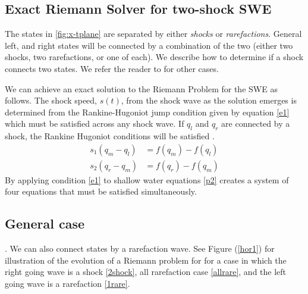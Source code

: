 \documentclass[11pt,a4paper]{article}
\newcommand{\donna}[1]{{\color{red}{#1}}}
\newcommand{\ignore}[1]{}
\begin{document}
	\subsection{Exact Riemann Solver for two-shock SWE}
The states in \ref{fig:x-tplane} are separated by either {\em shocks} or {\em rarefactions}. General left, and right states will be connected by a combination of the two (either two shocks, two rarefactions, or one of each).  We describe how to determine if a shock connects two states.  We refer the reader to \cite{leveque2002finite} for other cases. 

We can achieve an exact solution to the Riemann Problem for the SWE as follows. 
The shock speed, $s(t)$,  from the shock wave as the solution emerges is determined from the Rankine-Hugoniot jump condition given by equation \eqref{e1}  which must be satisfied across any shock wave.  If $q_l$ and $q_r$ are connected by a shock, the Rankine Hugoniot conditions will be satisfied \cite{ma-ah-be-ca-ge-ha-ke-le-le:2016}. 
	\begin{equation}
		\begin{aligned}
			s_1(q_{m} - q_{l}) & = f(q_{m}) - f(q_{l}) \\
			s_2(q_{r} - q_{m}) & = f(q_{r}) - f(q_{m})
		\end{aligned}
		\label{e1}
	\end{equation}
	By applying condition  \eqref{e1} to shallow water equations \eqref{p2}  creates a system of four equations that must be satisfied simultaneously. 
	
	\donna{Since this section is on the all-shock case, it would be good to just show the evolution of that example. (Maybe two plots of the height and two plots of the velocity?).  Or three smaller plots of evolution of height and velocity. (three per row?).}
	

	\subsection{General case}
	\donna{The Lax entropy condition requiring that $h_m > h_r$ may not be satisfied in all cases}.   \ignore{Not all left and right states can be connected by a shock wave.  In this case,} We can also connect states by a rarefaction wave. See Figure (\ref{hor1})  for illustration of the evolution of a Riemann problem for for a case in which the right going wave is a shock \ref{2shock}, all rarefaction case \ref{allrare}, and the left going wave is a rarefaction \ref{1rare}.
\end{document}
